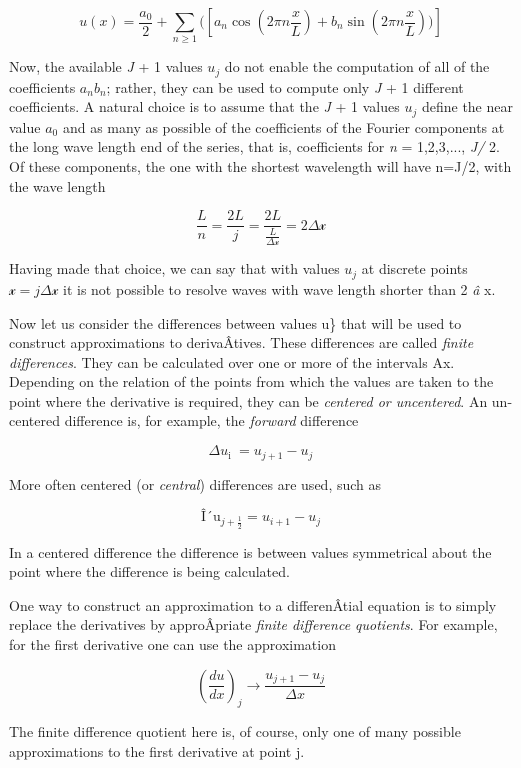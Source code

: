 \[u( x ) = \frac{a_{0}}{2} + \sum_{n \geq 1}(\left[  a_{n}  \cos\left(2\pi n \frac{x}{L}\right) 
+ b_{n}   \sin\left(2\pi n \frac{x}{L} \right))\right]\]

Now, the available \emph{J} + 1 values \(u_j\) do not enable the
computation of all of the coefficients \(a_{n}b_{n}\); rather, they can
be used to compute only \emph{J} + 1 different coefficients. A natural
choice is to assume that the \emph{J} + 1 values \(u_j\) define the near
value \(a_{0}\) and as many as possible of the coefficients of the
Fourier components at the long wave length end of the series, that is,
coefficients for \emph{n} = 1,2,3,..., \emph{J/} 2. Of these components,
the one with the shortest wavelength will have n=J/2, with the wave
length

\[\frac{L}{n} =  \frac{2L}{j} =  \frac{2L}{\frac{L}{\Delta\mathcal{x}}} = 2\Delta\mathcal{x}\]

Having made that choice, we can say that with values \(u_{j}\) at
discrete points \(\mathcal{x =}j\Delta\mathcal{x}\) it is not possible
to resolve waves with wave length shorter than 2 \emph{â} x.

Now let us consider the differences between values u\} that will be used
to construct approximations to derivaÂ­tives. These differences are
called \emph{finite differences}. They can be calculated over one or
more of the intervals Ax. Depending on the relation of the points from
which the values are taken to the point where the derivative is
required, they can be \emph{centered or uncentered}. An un-centered
difference is, for example, the \emph{forward} difference

\[\Delta u_{\text{i }} = u_{j + 1}  - u_{j}\]

More often centered (or \emph{central}) differences are used, such as

\[\text{Î´u}_{j + \frac{1}{2}} =  u_{i + 1} -  u_{j}\]

In a centered difference the difference is between values symmetrical
about the point where the difference is being calculated.

One way to construct an approximation to a differenÂ­tial equation is to
simply replace the derivatives by approÂ­priate \emph{finite difference
quotients}. For example, for the first derivative one can use the
approximation

{\[\left( \frac{d u}{d x } \right)_j \to \frac{u_{j + 1} - u_{j}}{\Delta x}\]}

The finite difference quotient here is, of course, only one of many
possible approximations to the first derivative at point j.

